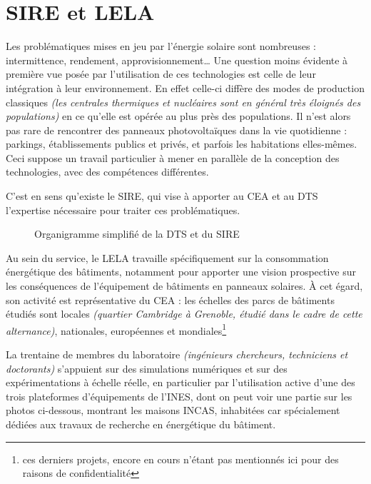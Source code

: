 \chapter{SIRE et LELA}\label{ch:sire-et-lela}

Les problématiques mises en jeu par l'énergie solaire sont nombreuses : intermittence, rendement, approvisionnement\ldots
Une question moins évidente à première vue posée par l'utilisation de ces technologies est celle de leur intégration à leur environnement.
En effet celle-ci diffère des modes de production classiques \textit{(les centrales thermiques et nucléaires sont en général très éloignés des populations)} en ce qu'elle est opérée au plus près des populations.
Il n'est alors pas rare de rencontrer des panneaux photovoltaïques dans la vie quotidienne : parkings, établissements publics et privés, et parfois les habitations elles-mêmes.
Ceci suppose un travail particulier à mener en parallèle de la conception des technologies, avec des compétences différentes.

C'est en sens qu'existe le \gls{SIRE}, qui vise à apporter au \gls{CEA} et au \gls{DTS} l'expertise nécessaire pour traiter ces problématiques.

\begin{figure}[H]
    \centering
    \fbox{}
    \caption{Organigramme simplifié de la DTS et du SIRE}
    \label{fig:organigramme-DTS}
\end{figure}

\newpage Au sein du service, le \gls{LELA} travaille spécifiquement sur la consommation énergétique des bâtiments, notamment pour apporter une vision prospective sur les conséquences de l'équipement de bâtiments en panneaux solaires.
À cet égard, son activité est représentative du \gls{CEA} : les échelles des parcs de bâtiments étudiés sont locales \textit{(quartier Cambridge à Grenoble, étudié dans le cadre de cette alternance)}, nationales, européennes et mondiales\footnote{ces derniers projets, encore en cours n'étant pas mentionnés ici pour des raisons de confidentialité}

La trentaine de membres du laboratoire \textit{(ingénieurs chercheurs, techniciens et doctorants)} s'appuient sur des simulations numériques et sur des expérimentations à échelle réelle, en particulier par l'utilisation active d'une des trois plateformes d'équipements de l'\gls{INES}, dont on peut voir une partie sur les photos ci-dessous, montrant les maisons \gls{INCAS}, inhabitées car spécialement dédiées aux travaux de recherche en énergétique du bâtiment.

